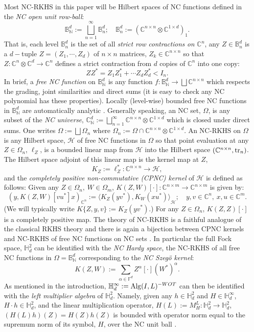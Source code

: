 \documentclass[11pt]{article}
\newcommand{\mr}{\ensuremath{\mathrm}}
\newcommand{\Om}{\ensuremath{\Omega}}
\def\C{\mathbb{C}}
\def\N{\mathbb{N}}
\def\B{\mathbb{B}}
\def\cH{\mathcal{H}}
\def\bH{\mathbb{H}}
\newcommand{\F}{\ensuremath{\mathbb{F} }}
\newcommand{\ip}[2]{\ensuremath{\langle {#1} , {#2} \rangle}}
\newcommand{\ipcn}[2]{\ensuremath{\left( {#1} , {#2} \right) _{\C ^n}}}
\numberwithin{equation}{section}
\numberwithin{subsection}{section}
\theoremstyle{definition}
\begin{document}
Most NC-RKHS in this paper will be Hilbert spaces of NC functions defined in the \emph{NC open unit row-ball}:
$$ \B ^d _\N := \bigsqcup _{n=1} ^\infty \B ^d _n; \quad \B ^d _n := \left( \C ^{n \times n} \otimes \C ^{1\times d} \right) _1. $$ That is, each level $\B ^d _n$ is the set of all \emph{strict row contractions on $\C ^n$}, any $Z \in \B ^d _n$ is a $d-$tuple $Z = \left( Z_1 , \cdots , Z_d \right)$ of $n\times n$ matrices, $Z_k \in \C ^{n\times n}$ so that $Z : \C ^{n} \otimes \C ^d \rightarrow \C ^n$ defines a strict contraction from $d$ copies of $\C ^n$ into one copy:
$$ Z Z ^* = Z_1 Z_1 ^* + \cdots Z_d Z_d ^* < I_n. $$ 
In brief, a \emph{free NC function} on $\B ^d _\N$ is any function $f : \B ^d _\N \rightarrow \bigsqcup \C ^{n\times n}$ which respects the grading, joint similarities and direct sums (it is easy to check any NC polynomial has these properties). Locally (level-wise) bounded free NC functions in $\B ^d _\N$ are automatically analytic \cite[Chapter 7]{KVV}. Generally speaking, an NC set, $\Om$, is any subset of the \emph{NC universe}, $\C ^d _\N := \bigsqcup _{n=1} ^\infty \C ^{n\times n} \otimes \C ^{1 \times d}$ which is closed under direct sums. One writes $\Om := \bigsqcup \Om _n$ where $\Om _n := \Om \cap \C ^{n\times n} \otimes \C ^{1\times d}$. An NC-RKHS on $\Om$ is any Hilbert space, $\cH$ of free NC functions in $\Om$ so that point evaluation at any $Z \in \Om _n$, $\ell _Z$, is a bounded linear map from $\cH$ into the Hilbert space $\left( \C ^{n\times n} , \mr{tr} _n \right)$. The Hilbert space adjoint of this linear map is the kernel map at $Z$,  
$$ K_Z := \ell _Z ^* : \C ^{n\times n} \rightarrow \cH, $$ and the \emph{completely positive non-commutative (CPNC) kernel} of $\cH$ is defined as follows: Given any $Z \in \Om _n , \ W \in \Om _m$, $K(Z,W) [ \cdot ] : \C ^{n\times m} \rightarrow \C ^{n \times m}$ is given by:
$$ \ipcn{y}{K(Z,W) [vu^*] x} := \ip{K_Z (yv^*)}{K_W (xu^*)}_\cH; \quad y, v \in \C ^n, \ x,u \in \C ^m. $$ (We will typically write $K\{Z, y ,v \} := K _Z (y v^* )$.) For any $Z \in \Om _n$, $K(Z,Z) [ \cdot ]$ is a completely positive map. The theory of NC-RKHS is a faithful analogue of the classical RKHS theory and there is again a bijection between CPNC kernels and NC-RKHS of free NC functions on NC sets \cite{BMV}. In particular the full Fock space, $\bH ^2 _d$ can be identified with the \emph{NC Hardy space}, the NC-RKHS of all free NC functions in $\Om = \B ^d _\N$ corresponding to the \emph{NC Szeg\"{o} kernel}:
$$ K(Z,W) := \sum _{\alpha \in \F ^d} Z^\alpha [ \cdot ] (W^* ) ^\alpha. $$ As mentioned in the introduction, $\bH ^\infty _d := \mr{Alg} (I , L) ^{-WOT}$ can then be identified with the \emph{left multiplier algebra} of $\bH ^2 _d$. Namely, given any $h \in \bH ^2 _d$ and $H \in \bH ^\infty _d$, $H \cdot h \in \bH ^2 _d$, and the linear multiplication operator, 
$H(L) := M^L _H : \bH ^2 _d \rightarrow \bH ^2 _d$, $( H(L) h) (Z) = H (Z) h (Z)$ is bounded with operator norm equal to the supremum norm of its symbol, $H$, over the NC unit ball \cite[Theorem 3.1]{SSS}. 
\end{document}
